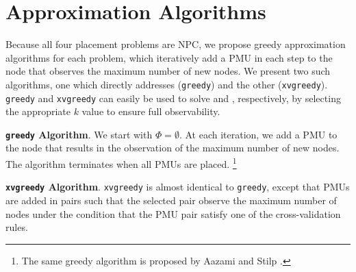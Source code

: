 \section{Approximation Algorithms}
\label{sec:approx}

Because all four placement problems are NPC, we propose greedy approximation algorithms for each problem, which iteratively add 
a PMU in each step to the node that observes the maximum number of new nodes. We present two such algorithms, one which directly addresses \maxinc ({\tt greedy}) and the other 
\xvalpart ({\tt xvgreedy}). {\tt greedy} and {\tt xvgreedy} can easily be used to solve \full and \xvals, respectively, by selecting the appropriate $k$ value to ensure full observability.

{\bf {\tt greedy} Algorithm}. We start with $\Phi = \emptyset$.  At each iteration, we add a PMU to the node that results in the observation of the maximum number of 
new nodes. The algorithm terminates when all PMUs are placed.  {\footnote {\small The same greedy algorithm is proposed by Aazami and Stilp \cite{Aazami07}. }}


{\bf {\tt xvgreedy} Algorithm}. {\tt xvgreedy} is almost identical to {\tt greedy}, except that PMUs are added in pairs such that the selected pair observe
the maximum number of nodes under the condition that the PMU pair satisfy one of the cross-validation rules. %



